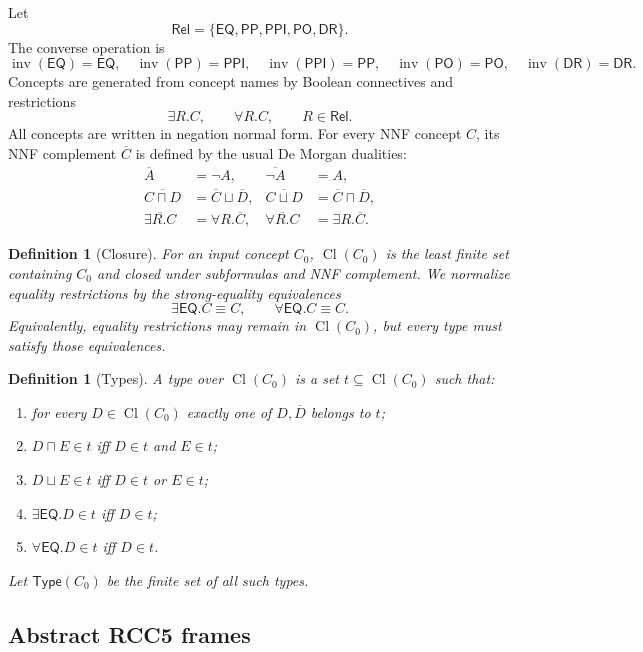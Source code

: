 \documentclass[11pt]{article}
\newtheorem{definition}[theorem]{Definition}
\newcommand{\Rel}{\mathsf{Rel}}
\newcommand{\EQ}{\mathsf{EQ}}
\newcommand{\PP}{\mathsf{PP}}
\newcommand{\PPI}{\mathsf{PPI}}
\newcommand{\PO}{\mathsf{PO}}
\newcommand{\DR}{\mathsf{DR}}
\newcommand{\Inv}{\operatorname{inv}}
\newcommand{\Cl}{\operatorname{Cl}}
\newcommand{\Typ}{\mathsf{Type}}
\begin{document}
Let
\[
  \Rel=\{\EQ,\PP,\PPI,\PO,\DR\}.
\]
The converse operation is
\[
\Inv(\EQ)=\EQ,
\quad
\Inv(\PP)=\PPI,
\quad
\Inv(\PPI)=\PP,
\quad
\Inv(\PO)=\PO,
\quad
\Inv(\DR)=\DR.
\]
Concepts are generated from concept names by Boolean connectives and restrictions
\[
  \exists R.C,
  \qquad
  \forall R.C,
  \qquad R\in\Rel.
\]
All concepts are written in negation normal form.  For every NNF concept $C$, its NNF complement $\overline C$ is defined by the usual De Morgan dualities:
\begin{align*}
\overline A&=\neg A,&
\overline{\neg A}&=A,\\
\overline{C\sqcap D}&=\overline C\sqcup\overline D,&
\overline{C\sqcup D}&=\overline C\sqcap\overline D,\\
\overline{\exists R.C}&=\forall R.\overline C,&
\overline{\forall R.C}&=\exists R.\overline C.
\end{align*}

\begin{definition}[Closure]
For an input concept $C_0$, $\Cl(C_0)$ is the least finite set containing $C_0$ and closed under subformulas and NNF complement.  We normalize equality restrictions by the strong-equality equivalences
\[
  \exists\EQ.C\equiv C,
  \qquad
  \forall\EQ.C\equiv C.
\]
Equivalently, equality restrictions may remain in $\Cl(C_0)$, but every type must satisfy those equivalences.
\end{definition}

\begin{definition}[Types]
A type over $\Cl(C_0)$ is a set $t\subseteq\Cl(C_0)$ such that:
\begin{enumerate}[label=(T\arabic*)]
\item for every $D\in\Cl(C_0)$ exactly one of $D,\overline D$ belongs to $t$;
\item $D\sqcap E\in t$ iff $D\in t$ and $E\in t$;
\item $D\sqcup E\in t$ iff $D\in t$ or $E\in t$;
\item $\exists\EQ.D\in t$ iff $D\in t$;
\item $\forall\EQ.D\in t$ iff $D\in t$.
\end{enumerate}
Let $\Typ(C_0)$ be the finite set of all such types.
\end{definition}

\subsection{Abstract RCC5 frames}
\end{document}
